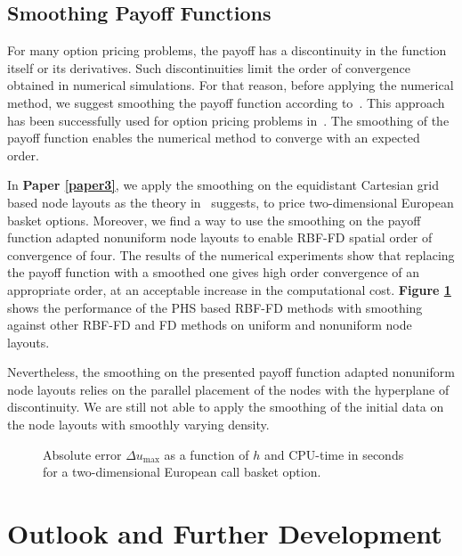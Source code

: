 \documentclass{UUThesisTemplate}
\begin{document}
%
\section{Smoothing Payoff Functions}

\par
For many option pricing problems, the payoff has a discontinuity in the function itself or its derivatives. Such discontinuities limit the order of convergence obtained in numerical simulations. For that reason, before applying the numerical method, we suggest smoothing the payoff function according to~\cite{kreiss1970smoothing}. This approach has been successfully used for option pricing problems in~\cite{pooley2003convergence,during2015high}. The smoothing of the payoff function enables the numerical method to converge with an expected order. 

\par
In \textbf{Paper \ref{paper3}}, we apply the smoothing on the equidistant Cartesian grid based node layouts as the theory in~\cite{kreiss1970smoothing} suggests, to price two-dimensional European basket options. Moreover, we find a way to use the smoothing on the payoff function adapted nonuniform node layouts to enable RBF-FD spatial order of convergence of four. The results of the numerical experiments show that replacing the payoff function with a smoothed one gives high order convergence of an appropriate order, at an acceptable increase in the computational cost. \textbf{Figure \ref{fig:smoothing}} shows the performance of the PHS based RBF-FD methods with smoothing against other RBF-FD and FD methods on uniform and nonuniform node layouts. 

\par
Nevertheless, the smoothing on the presented payoff function adapted nonuniform node layouts relies on the parallel placement of the nodes with the hyperplane of discontinuity. We are still not able to apply the smoothing of the initial data on the node layouts with smoothly varying density. 
\begin{figure}[H]
\centering
\hspace{11pt}

\caption{Absolute error $\Delta u_{\max}$ as a function of $h$ and CPU-time in seconds for a two-dimensional European call basket option.}
\label{fig:smoothing}
\end{figure}



%
\chapter{Outlook and Further Development}
\label{ch:outlook}
\end{document}
